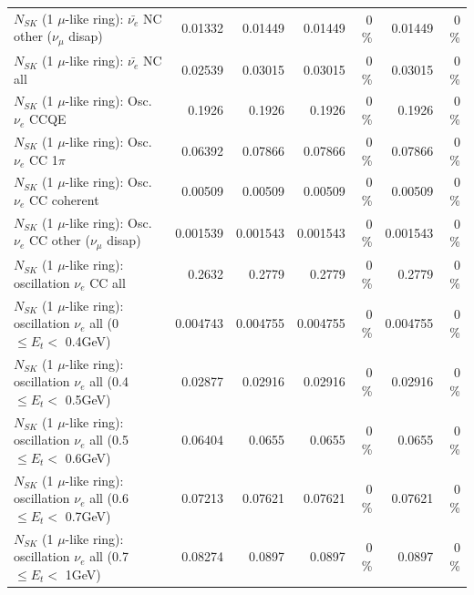 \begin{table}
\begin{tabular}{| l | r | r | r  r | r  r |}
          $N_{SK}$ (1 $\mu$-like ring): $\bar{\nu_e}$ NC other ($\nu_\mu$ disap) &         0.01332 &         0.01449 &         0.01449 &        0 \%  &         0.01449 &        0 \%  \\ 
                            $N_{SK}$ (1 $\mu$-like ring): $\bar{\nu_{e}}$ NC all &         0.02539 &         0.03015 &         0.03015 &        0 \%  &         0.03015 &        0 \%  \\ 
\hline
\hline
\hline
                                 $N_{SK}$ (1 $\mu$-like ring): Osc. $\nu_e$ CCQE &          0.1926 &          0.1926 &          0.1926 &        0 \%  &          0.1926 &        0 \%  \\ 
                            $N_{SK}$ (1 $\mu$-like ring): Osc. $\nu_e$ CC 1$\pi$ &         0.06392 &         0.07866 &         0.07866 &        0 \%  &         0.07866 &        0 \%  \\ 
                          $N_{SK}$ (1 $\mu$-like ring): Osc. $\nu_e$ CC coherent &         0.00509 &         0.00509 &         0.00509 &        0 \%  &         0.00509 &        0 \%  \\ 
           $N_{SK}$ (1 $\mu$-like ring): Osc. $\nu_e$ CC other ($\nu_\mu$ disap) &        0.001539 &        0.001543 &        0.001543 &        0 \%  &        0.001543 &        0 \%  \\ 
                        $N_{SK}$ (1 $\mu$-like ring): oscillation $\nu_e$ CC all &          0.2632 &          0.2779 &          0.2779 &        0 \%  &          0.2779 &        0 \%  \\ 
\hline
$N_{SK}$ (1 $\mu$-like ring): oscillation $\nu_{e}$ all (0 $\leq E_{t} <$ 0.4GeV) &        0.004743 &        0.004755 &        0.004755 &        0 \%  &        0.004755 &        0 \%  \\ 
$N_{SK}$ (1 $\mu$-like ring): oscillation $\nu_{e}$ all (0.4 $\leq E_{t} <$ 0.5GeV) &         0.02877 &         0.02916 &         0.02916 &        0 \%  &         0.02916 &        0 \%  \\ 
$N_{SK}$ (1 $\mu$-like ring): oscillation $\nu_{e}$ all (0.5 $\leq E_{t} <$ 0.6GeV) &         0.06404 &          0.0655 &          0.0655 &        0 \%  &          0.0655 &        0 \%  \\ 
$N_{SK}$ (1 $\mu$-like ring): oscillation $\nu_{e}$ all (0.6 $\leq E_{t} <$ 0.7GeV) &         0.07213 &         0.07621 &         0.07621 &        0 \%  &         0.07621 &        0 \%  \\ 
$N_{SK}$ (1 $\mu$-like ring): oscillation $\nu_{e}$ all (0.7 $\leq E_{t} <$ 1GeV) &         0.08274 &          0.0897 &          0.0897 &        0 \%  &          0.0897 &        0 \%  \\ 

\end{tabular}
\end{table}
